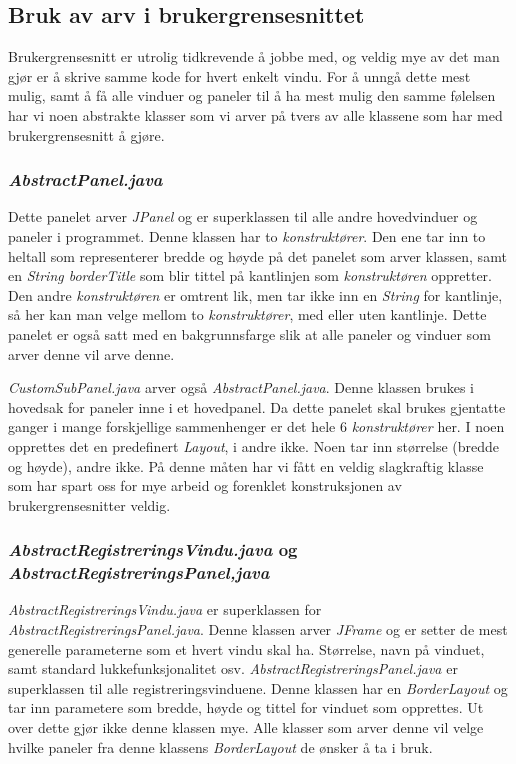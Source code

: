 \subsection{Bruk av arv i brukergrensesnittet}
Brukergrensesnitt er utrolig tidkrevende å jobbe med, og veldig mye av det man gjør er å skrive samme kode for hvert enkelt vindu.
For å unngå dette mest mulig, samt å få alle vinduer og paneler til å ha mest mulig den samme følelsen har vi noen abstrakte klasser som vi arver på tvers av alle klassene som har med brukergrensesnitt å gjøre.

\subsubsection*{\emph{AbstractPanel.java}}
Dette panelet arver \emph{JPanel} og er superklassen til alle andre hovedvinduer og paneler i programmet.
Denne klassen har to \emph{konstruktører}. Den ene tar inn to heltall som representerer bredde og høyde på det panelet som arver klassen, samt en \emph{String borderTitle} som blir tittel på kantlinjen som \emph{konstruktøren} oppretter.
Den andre \emph{konstruktøren} er omtrent lik, men tar ikke inn en \emph{String} for kantlinje, så her kan man velge mellom to \emph{konstruktører}, med eller uten kantlinje.
Dette panelet er også satt med en bakgrunnsfarge slik at alle paneler og vinduer som arver denne vil arve denne.

\emph{CustomSubPanel.java} arver også \emph{AbstractPanel.java}. Denne klassen brukes i hovedsak for paneler inne i et hovedpanel. Da dette panelet skal brukes gjentatte ganger i mange forskjellige sammenhenger er det hele 6 \emph{konstruktører} her. 
I noen opprettes det en predefinert \emph{Layout}, i andre ikke. Noen tar inn størrelse (bredde og høyde), andre ikke. På denne måten har vi fått en veldig slagkraftig klasse som har spart oss for mye arbeid og forenklet konstruksjonen av brukergrensesnitter veldig.

\subsubsection*{\emph{AbstractRegistreringsVindu.java} og \emph{AbstractRegistreringsPanel,java}}
\emph{AbstractRegistreringsVindu.java} er superklassen for \emph{AbstractRegistreringsPanel.java}. Denne klassen arver \emph{JFrame} og er setter de mest generelle parameterne som et hvert vindu skal ha. Størrelse, navn på vinduet, samt standard lukkefunksjonalitet osv.
\emph{AbstractRegistreringsPanel.java} er superklassen til alle registreringsvinduene. Denne klassen har en \emph{BorderLayout} og tar inn parametere som bredde, høyde og tittel for vinduet som opprettes. Ut over dette gjør ikke denne klassen mye. Alle klasser som arver denne vil velge hvilke paneler fra denne klassens \emph{BorderLayout} de ønsker å ta i bruk.

